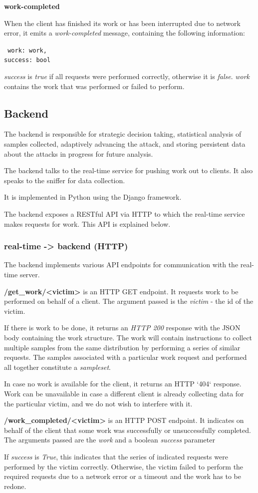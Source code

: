  \textbf{work-completed}

When the client has finished its work or has been interrupted due to network
error, it emits a \textit{work-completed} message, containing the following
information:

\texttt
{
  work: work,\\
  success: bool
}


\textit{success} is \textit{true} if all requests were performed correctly, otherwise it
is \textit{false}. \textit{work} contains the work that was performed or failed to perform.

\subsection{Backend}

The backend is responsible for strategic decision taking, statistical analysis
of samples collected, adaptively advancing the attack, and storing persistent
data about the attacks in progress for future analysis.

The backend talks to the real-time service for pushing work out to clients. It
also speaks to the sniffer for data collection.

It is implemented in Python using the Django framework.

The backend exposes a RESTful API via HTTP to which the real-time service
makes requests for work. This API is explained below.

\subsubsection{real-time -> backend (HTTP)}

The backend implements various API endpoints for communication with the
real-time server.


\textbf{/get\_work/<victim>} is an HTTP GET endpoint. It requests work to 
be performed on behalf of a client. The argument passed is the \textit{victim}
- the id of the victim.

If there is work to be done, it returns an \textit{HTTP 200} response with the JSON
body containing the work structure. The work will contain instructions to
collect multiple samples from the same distribution by performing a series of
similar requests. The samples associated with a particular work request and
performed all together constitute a \textit{sampleset}.

In case no work is available for the client, it returns an HTTP `404` response.
Work can be unavailable in case a different client is already collecting data
for the particular victim, and we do not wish to interfere with it.

\textbf{/work\_completed/<victim>} is an HTTP POST endpoint. It indicates on behalf 
of the client that some work was successfully or unsuccessfully completed. The arguments
passed are the \textit{work} and a boolean \textit{success} parameter

If \textit{success} is \textit{True}, this indicates that the series of indicated requests
were performed by the victim correctly. Otherwise, the victim failed to perform
the required requests due to a network error or a timeout and the work has to
be redone.


